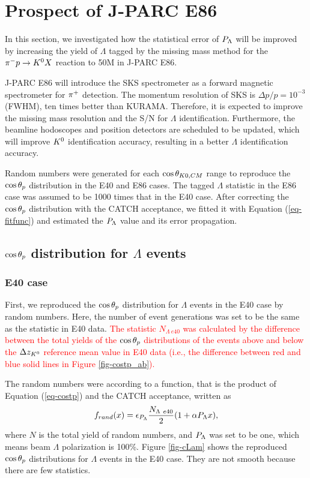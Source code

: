 \section{Prospect of J-PARC E86}
\label{sec-prospect}

In this section, we investigated how the statistical error of $P_{\Lambda}$ will be improved by increasing the yield of $\Lambda$ tagged by the missing mass method for the $\pi^- p \to K^0 X$ reaction to 50M in J-PARC E86. 

J-PARC E86 will introduce the SKS spectrometer \cite{K1.8} as a forward magnetic spectrometer for $\pi^{+}$ detection. The momentum resolution of SKS is $\Delta p/p=10^{-3}$ (FWHM), ten times better than KURAMA. Therefore, it is expected to improve the missing mass resolution and the S/N for $\Lambda$ identification. Furthermore, the beamline hodoscopes and position detectors are scheduled to be updated, which will improve $K^{0}$ identification accuracy, resulting in a better $\Lambda$ identification accuracy.

Random numbers were generated for each $\cos{\theta_{K0,CM}}$ range to reproduce the $\cos{\theta_p}$ distribution in the E40 and E86 cases. The tagged $\Lambda$ statistic in the E86 case was assumed to be 1000 times that in the E40 case. After correcting the $\cos{\theta_p}$ distribution with the CATCH acceptance, we fitted it with Equation (\ref{eq-fitfunc}) and estimated the $P_{\Lambda}$ value and its error propagation.

\subsection{$\cos{\theta_p}$ distribution for $\Lambda$ events}
\label{subsec-randcostpLam}
\subsubsection{E40 case}
First, we reproduced the $\cos{\theta_p}$ distribution for $\Lambda$ events in the E40 case by random numbers. Here, the number of event generations was set to be the same as the statistic in E40 data. \textcolor{red}{ The statistic $N_{\Lambda\ e40}$ was calculated by the difference between the total yields of the $\cos{\theta_p}$ distributions of the events above and below the $\Delta z_{K^{0}}$ reference mean value in E40 data (i.e., the difference between red and blue solid lines in Figure \ref{fig-costp_ab}). }

The random numbers were according to a function, that is the product of Equation (\ref{eq-costp}) and the CATCH acceptance, written as
\begin{equation}
  f_{rand}(x) = \epsilon_{P_{\Lambda}} \frac{N_{\Lambda\ e40}}{2}(1+\alpha P_{\Lambda} x),
  \label{eq-randfunc}
\end{equation}
where $N$ is the total yield of random numbers, and $P_{\Lambda}$ was set to be one, which means beam $\Lambda$ polarization is 100\%.  Figure \ref{fig-cLam} shows the reproduced $\cos{\theta_p}$ distributions for $\Lambda$ events in the E40 case. They are not smooth because there are few statistics.

